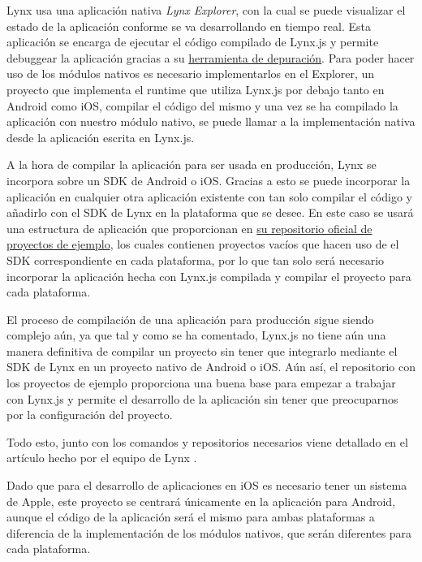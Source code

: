Lynx usa una aplicación nativa \textit{Lynx Explorer}, con la cual se puede visualizar el estado de la aplicación conforme se va desarrollando en tiempo real.
Esta aplicación se encarga de ejecutar el código compilado de Lynx.js y permite debuggear la aplicación gracias a su \href{https://github.com/lynx-family/lynx-devtool}{herramienta de depuración}.
Para poder hacer uso de los módulos nativos es necesario implementarlos en el Explorer, un proyecto que implementa el runtime que utiliza Lynx.js por debajo tanto en Android como iOS, compilar el código del mismo y una vez se ha compilado la aplicación con nuestro módulo nativo, se puede llamar a la implementación nativa desde la aplicación escrita en Lynx.js.

A la hora de compilar la aplicación para ser usada en producción, Lynx se incorpora sobre un SDK de Android o iOS. Gracias a esto se puede incorporar la aplicación en cualquier otra aplicación existente con tan solo compilar el código y añadirlo con el SDK de Lynx en la plataforma que se desee.
En este caso se usará una estructura de aplicación que proporcionan en \href{https://github.com/lynx-family/integrating-lynx-demo-projects}{su repositorio oficial de proyectos de ejemplo}, los cuales contienen proyectos vacíos que hacen uso de el SDK correspondiente en cada plataforma, por lo que tan solo será necesario incorporar la aplicación hecha con Lynx.js compilada y compilar el proyecto para cada plataforma.

El proceso de compilación de una aplicación para producción sigue siendo complejo aún, ya que tal y como se ha comentado, Lynx.js no tiene aún una manera definitiva de compilar un proyecto sin tener que integrarlo mediante el SDK de Lynx en un proyecto nativo de Android o iOS. Aún así, el repositorio con los proyectos de ejemplo proporciona una buena base para empezar a trabajar con Lynx.js y permite el desarrollo de la aplicación sin tener que preocuparnos por la configuración del proyecto.

Todo esto, junto con los comandos y repositorios necesarios viene detallado en el artículo hecho por el equipo de Lynx \parencite{lynx-native-modules}.

Dado que para el desarrollo de aplicaciones en iOS es necesario tener un sistema de Apple, este proyecto se centrará únicamente en la aplicación para Android, aunque el código de la aplicación será el mismo para ambas plataformas a diferencia de la implementación de los módulos nativos, que serán diferentes para cada plataforma.

